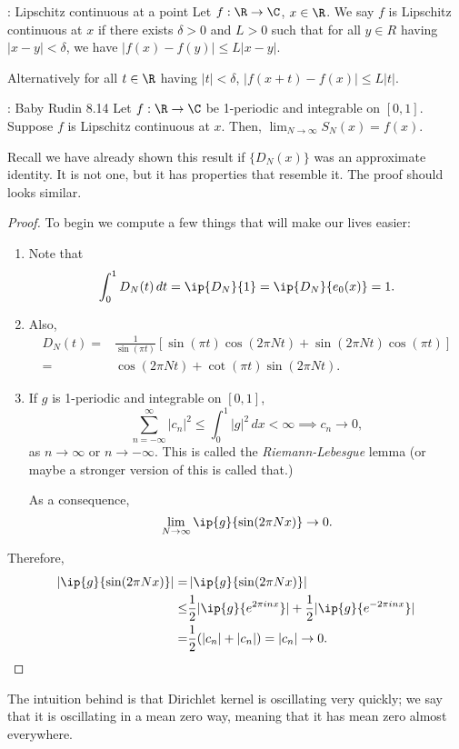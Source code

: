 \begin{ndef}{: Lipschitz continuous at a point}
    Let \(f:\R\to\C\), \(x\in\R\). We say \(f\) is Lipschitz continuous at \(x\) if there exists \(\delta>0\) and \(L>0\) such that for all \(y\in R\) having \(|x-y|<\delta\), we have \(|f(x)-f(y)|\leq L|x-y|\).

    \medskip

    Alternatively for all \(t\in\R\) having \(|t|<\delta\), \(|f(x+t)-f(x)|\leq L|t|\).
\end{ndef}

\begin{ntheorem}{: Baby Rudin 8.14}
    Let \(f:\R\to\C\) be 1-periodic and integrable on \([0,1]\). Suppose \(f\) is Lipschitz continuous at \(x\). Then, \(\displaystyle\lim_{N\to\infty}S_N(x)=f(x)\).
\end{ntheorem}
Recall we have already shown this result if \(\{D_N(x)\}\) was an approximate identity. It is not one, but it has properties that resemble it. The proof should looks similar.
\begin{proof}
    To begin we compute a few things that will make our lives easier:
    \begin{enumerate}
        \item Note that 
        \begin{equation*} 
            \int_0^1 D_N(t) \, dt=\ip{D_N}{1}=\ip{D_N}{e_0(x)}=1.
        \end{equation*}
        
        \item Also,
        \begin{align*} 
            D_N(t)=&\frac{1}{\sin(\pi t)}[\sin(\pi t)\cos(2\pi Nt)+\sin(2\pi Nt)\cos(\pi t)]\\
            =&\cos(2\pi Nt)+\cot(\pi t)\sin(2\pi Nt).
        \end{align*}

        \item If \(g\) is 1-periodic and integrable on \([0,1]\),
        \begin{equation*} 
            \sum_{n=-\infty}^{\infty} |c_n|^2\leq \int_0^1 |g|^2 \, dx<\infty\implies c_n\to 0,
        \end{equation*}
        as \(n\to \infty\) or \(n\to-\infty\). This is called the \emph{Riemann-Lebesgue} lemma (or maybe a stronger version of this is called that.)

        \medskip
        
        As a consequence,
        \begin{equation*} 
            \lim_{N\to\infty}\ip{g}{\sin(2\pi Nx)}\to 0.
        \end{equation*}
    \end{enumerate}
    Therefore, 
    \begin{align*} 
        |\ip{g}{\sin(2\pi Nx)}|=&\left|\ip{g}{\sin(2\pi Nx)}\right|\\
                            \leq&\frac{1}{2}|\ip{g}{e^{2\pi inx}}|+\frac{1}{2}|\ip{g}{e^{-2\pi inx}}|\\
                               =&\frac{1}{2}(|c_n|+|c_n|)=|c_n|\to 0.
    \end{align*}
\end{proof}
The intuition behind is that Dirichlet kernel is oscillating very quickly; we say that it is oscillating in a mean zero way, meaning that it has mean zero almost everywhere.


